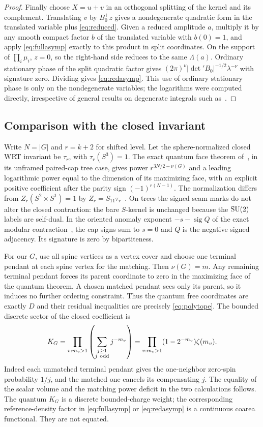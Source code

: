 \begin{proof}
Finally choose \(X=u+v\) in an orthogonal splitting of the kernel and its complement. Translating \(v\) by \(B_0^+ z\) gives a nondegenerate quadratic form in the translated variable plus \eqref{eq:reduced}. Given a reduced amplitude \(a\), multiply it by any smooth compact factor \(b\) of the translated variable with \(b(0)=1\), and apply \eqref{eq:fullasymp} exactly to this product in split coordinates. On the support of \(\prod_i\mu_i\), \(z=0\), so the right-hand side reduces to the same \(\Lambda(a)\). Ordinary stationary phase of the split quadratic factor gives \((2\pi)^\nu|\det{}' B_0|^{-1/2}\lambda^{-\nu}\) with signature zero. Dividing gives \eqref{eq:redasymp}. This use of ordinary stationary phase is only on the nondegenerate variables; the logarithms were computed directly, irrespective of general results on degenerate integrals such as~\cite{Duistermaat}.
\end{proof}

\subsection{Comparison with the closed invariant}

Write \(N=|G|\) and \(r=k+2\) for shifted level. Let the sphere-normalized closed WRT invariant be \(\tau_r\), with \(\tau_r(S^3)=1\). The exact quantum face theorem of~\cite{Paper48}, in its unframed paired-cap tree case, gives power \(r^{3N/2-\nu(G)}\) and a leading logarithmic power equal to the dimension of its maximizing face, with an explicit positive coefficient after the parity sign \((-1)^{r(N-1)}\). The normalization differs from \(Z_r(S^2\times S^1)=1\) by \(Z_r=S_{11}\tau_r\)~\cite{Turaev,Paper48}. On trees the signed seam marks do not alter the closed contraction: the bare \(S\)-kernel is unchanged because the \(\mathrm{SU}(2)\) labels are self-dual. In the oriented anomaly exponent \(-s-\operatorname{sig}Q\) of the exact modular contraction~\cite[Lemma~1.1]{Paper49}, the cap signs sum to \(s=0\) and \(Q\) is the negative signed adjacency. Its signature is zero by bipartiteness.

For our \(G\), use all spine vertices as a vertex cover and choose one terminal pendant at each spine vertex for the matching. Then \(\nu(G)=m\). Any remaining terminal pendant forces its parent coordinate to zero in the maximizing face of the quantum theorem. A chosen matched pendant sees only its parent, so it induces no further ordering constraint. Thus the quantum free coordinates are exactly \(D\) and their residual inequalities are precisely \eqref{eq:polytope}. The bounded discrete sector of the closed coefficient is
\[
        K_G=\prod_{v:m_v>1}\left(\sum_{\substack{j\ge1\\j\ {\rm odd}}}j^{-m_v}\right)
             =\prod_{v:m_v>1}(1-2^{-m_v})\zeta(m_v).
\]
Indeed each unmatched terminal pendant gives the one-neighbor zero-spin probability \(1/j\), and the matched one cancels its compensating \(j\). The equality of the scalar volume and the matching power deficit in the two calculations follows. The quantum \(K_G\) is a discrete bounded-charge weight; the corresponding reference-density factor in \eqref{eq:fullasymp} or \eqref{eq:redasymp} is a continuous coarea functional. They are not equated.

